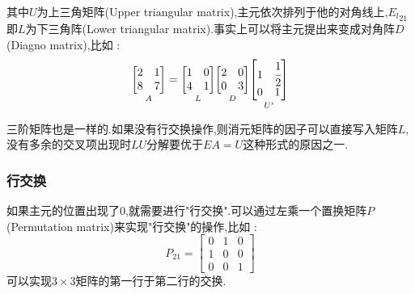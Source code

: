 \documentclass[UTF8,12pt]{ctexbook}
\DeclareMathOperator{\inverse}{^{-1}}
\begin{document}
{{{{{其中$U$为上三角矩阵(Upper triangular matrix),主元依次排列于他的对角线上,${E_l}_{21}\inverse$即$L$为下三角阵(Lower triangular matrix).事实上可以将主元提出来变成对角阵$D$(Diagno matrix),比如 :
$$
  \underset{A}{\begin{bmatrix}
      2 & 1 \\
      8 & 7
    \end{bmatrix}}
  =
  \underset{L}{\begin{bmatrix}
      1 & 0 \\
      4 & 1
    \end{bmatrix}}
  \underset{D}{\begin{bmatrix}
      2 & 0 \\
      0 & 3
    \end{bmatrix}}
  \underset{U^\prime}{\begin{bmatrix}
      1 & \cfrac{1}{2} \\
      0 & 1
    \end{bmatrix}}
$$

三阶矩阵也是一样的.如果没有行交换操作,则消元矩阵的因子可以直接写入矩阵$L$,没有多余的交叉项出现时$LU$分解要优于$EA = U$这种形式的原因之一.
}%

\subsubsection{行交换}{
  如果主元的位置出现了0,就需要进行"行交换".可以通过左乘一个置换矩阵$P$(Permutation matrix)来实现"行交换"的操作,比如 :
  $$
    P_{21} = \begin{bmatrix}
      0 & 1 & 0 \\
      1 & 0 & 0 \\
      0 & 0 & 1
    \end{bmatrix}
  $$可以实现$3 \times 3$矩阵的第一行于第二行的交换.

}}}}}
\end{document}
